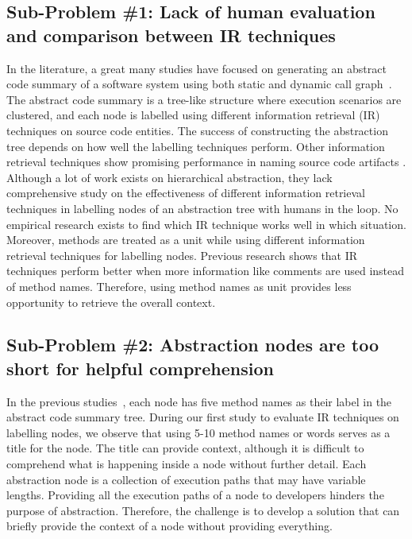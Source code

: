     \subsection{Sub-Problem \#1: Lack of human evaluation and comparison between IR techniques} In the literature, a great many studies have focused on generating an abstract code summary of a software system using both static and dynamic call graph~\cite{feng2018hierarchicalExecutionComprehension, gharibi2018automaticStaticCluster, xin2019identifyingFeaturesExecution}. The abstract code summary is a tree-like structure where execution scenarios are clustered, and each node is labelled using different information retrieval (IR) techniques on source code entities. The success of constructing the abstraction tree depends on how well the labelling techniques perform. Other information retrieval techniques show promising performance in naming source code artifacts \cite{chen2016topicMiningRepositories, panichella2013topicModelsTasks, sun2016surveyTopicSE}. Although a lot of work exists on hierarchical abstraction, they lack comprehensive study on the effectiveness of different information retrieval techniques in labelling nodes of an abstraction tree with humans in the loop. No empirical research exists to find which IR technique works well in which situation.
Moreover, methods are treated as a unit \cite{gharibi2018automaticStaticCluster, feng2018hierarchicalExecutionComprehension} while using different information retrieval techniques for labelling nodes. Previous research \cite{de2012IRMethodsArtifacts} shows that IR techniques perform better when more information like comments are used instead of method names. Therefore, using method names as unit provides less opportunity to retrieve the overall context.
    

    \subsection{Sub-Problem \#2: Abstraction nodes are too short for helpful comprehension}
    In the previous studies~\cite{feng2018hierarchicalExecutionComprehension, gharibi2018automaticStaticCluster}, each node has five method names as their label in the abstract code summary tree. During our first study to evaluate IR techniques on labelling nodes, we observe that using 5-10 method names or words serves as a title for the node. The title can provide context, although it is difficult to comprehend what is happening inside a node without further detail. Each abstraction node is a collection of execution paths that may have variable lengths. Providing all the execution paths of a node to developers hinders the purpose of abstraction. Therefore, the challenge is to develop a solution that can briefly provide the context of a node without providing everything. 
    
